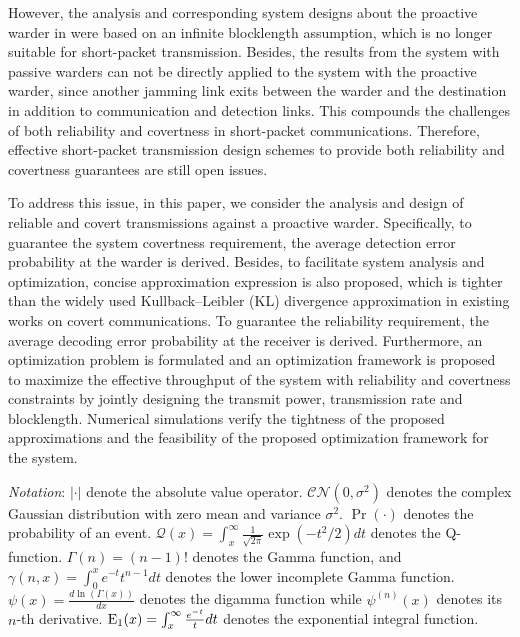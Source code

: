 \documentclass[conference]{IEEEtran}
\begin{document}
However, the analysis and corresponding system designs about the proactive warder in \cite{Active1,Active2,Active3} were based on an infinite blocklength assumption, which is no longer suitable for short-packet transmission. Besides, the results from the system with passive warders \cite{Fading3,Nmin,ECT2,Fading4,UAV} can not be directly applied to the system with the proactive warder, since another jamming link exits between the warder and the destination in addition to communication and detection links. This compounds the challenges of both reliability and covertness in short-packet communications. Therefore, effective short-packet transmission design schemes to provide both reliability and covertness guarantees are still open issues. 

To address this issue, in this paper, we consider the analysis and design of reliable and covert transmissions against a proactive warder. Specifically, to guarantee the system covertness requirement, the average detection error probability at the warder is derived. Besides, to facilitate system analysis and optimization, concise approximation expression is also proposed, which is tighter than the widely used Kullback–Leibler (KL) divergence approximation in existing works on covert communications. To guarantee the reliability requirement, the average decoding error probability at the receiver is derived. Furthermore, an optimization problem is formulated and an optimization framework is proposed to maximize the effective throughput of the system with reliability and covertness constraints by jointly designing the transmit power, transmission rate and blocklength. Numerical simulations verify the tightness of the proposed approximations and the feasibility of the proposed optimization framework for the system.

\emph{Notation}: $\left|  \cdot  \right|$ denote the absolute value operator. $\mathcal{C} \mathcal{N}(0, {\sigma^2})$ denotes the complex Gaussian distribution with zero mean and variance ${\sigma^2}$. ${\Pr}(\cdot)$ denotes the probability of an event. $\mathcal{Q}(x)=\int_x^{\infty} \frac{1}{\sqrt{2 \pi}} \exp \left(-t^2 / 2\right) d t$ denotes the Q-function. $\Gamma \left( n \right) = \left( {n - 1} \right)!$ denotes the Gamma function, and $\gamma(n, x)=\int_0^x e^{-t} t^{n-1} d t$ denotes the lower incomplete Gamma function. $\psi(x)=\frac{{d\ln \left( {\Gamma \left( x \right)} \right)}}{{dx}}$ denotes the digamma function while $\psi^{(n)}(x)$ denotes its $n$-th derivative. ${\rm{E_1}}(x) = \int_x^\infty  {\frac{{{e^{ - t}}}}{t}dt} $ denotes the exponential integral function.
\end{document}
